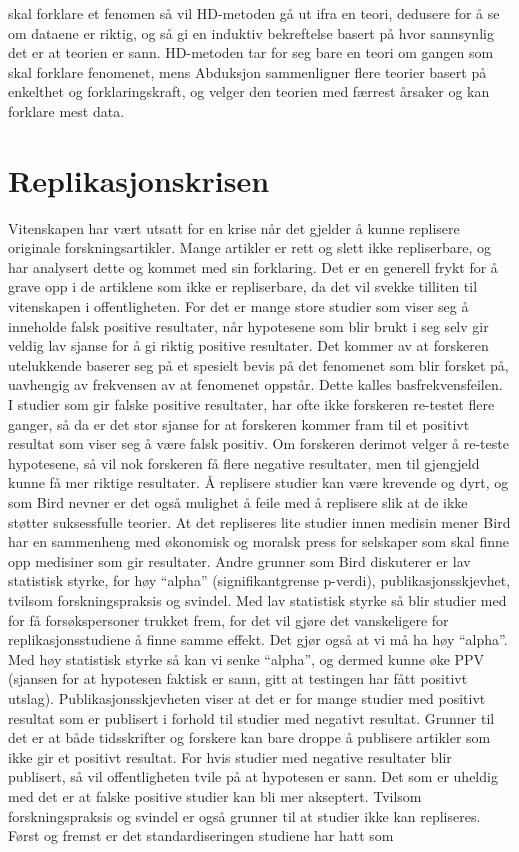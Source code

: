 \documentclass[
]{book}
\begin{document}
skal forklare et fenomen så vil HD-metoden gå ut ifra en teori, dedusere for å se om dataene er riktig, og så gi en induktiv bekreftelse basert på hvor sannsynlig det er at teorien er sann. HD-metoden tar for seg bare en teori om gangen som skal forklare fenomenet, mens Abduksjon sammenligner flere teorier basert på enkelthet og forklaringskraft, og velger den teorien med færrest årsaker og kan forklare mest data.

\hypertarget{replikasjonskrisen}{%
\section{Replikasjonskrisen}\label{replikasjonskrisen}}

Vitenskapen har vært utsatt for en krise når det gjelder å kunne replisere originale forskningsartikler. Mange artikler er rett og slett ikke repliserbare, og \citet{bird2020} har analysert dette og kommet med sin forklaring. Det er en generell frykt for å grave opp i de artiklene som ikke er repliserbare, da det vil svekke tilliten til vitenskapen i offentligheten. For det er mange store studier som viser seg å inneholde falsk positive resultater, når hypotesene som blir brukt i seg selv gir veldig lav sjanse for å gi riktig positive resultater. Det kommer av at forskeren utelukkende baserer seg på et spesielt bevis på det fenomenet som blir forsket på, uavhengig av frekvensen av at fenomenet oppstår. Dette kalles basfrekvensfeilen. I studier som gir falske positive resultater, har ofte ikke forskeren re-testet flere ganger, så da er det stor sjanse for at forskeren kommer fram til et positivt resultat som viser seg å være falsk positiv. Om forskeren derimot velger å re-teste hypotesene, så vil nok forskeren få flere negative resultater, men til gjengjeld kunne få mer riktige resultater. Å replisere studier kan være krevende og dyrt, og som Bird nevner er det også mulighet å feile med å replisere slik at de ikke støtter suksessfulle teorier. At det repliseres lite studier innen medisin mener Bird har en sammenheng med økonomisk og moralsk press for selskaper som skal finne opp medisiner som gir resultater. Andre grunner som Bird diskuterer er lav statistisk styrke, for høy ``alpha'' (signifikantgrense p-verdi), publikasjonsskjevhet, tvilsom forskningspraksis og svindel. Med lav statistisk styrke så blir studier med for få forsøkspersoner trukket frem, for det vil gjøre det vanskeligere for replikasjonsstudiene å finne samme effekt. Det gjør også at vi må ha høy ``alpha''. Med høy statistisk styrke så kan vi senke ``alpha'', og dermed kunne øke PPV (sjansen for at hypotesen faktisk er sann, gitt at testingen har fått positivt utslag). Publikasjonsskjevheten viser at det er for mange studier med positivt resultat som er publisert i forhold til studier med negativt resultat. Grunner til det er at både tidsskrifter og forskere kan bare droppe å publisere artikler som ikke gir et positivt resultat. For hvis studier med negative resultater blir publisert, så vil offentligheten tvile på at hypotesen er sann. Det som er uheldig med det er at falske positive studier kan bli mer akseptert. Tvilsom forskningspraksis og svindel er også grunner til at studier ikke kan repliseres. Først og fremst er det standardiseringen studiene har hatt som 
\end{document}
